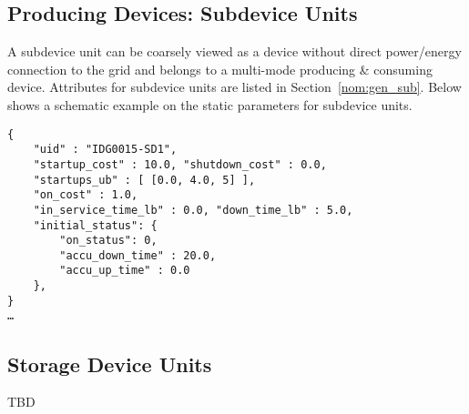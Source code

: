 \subsection{Producing Devices: Subdevice Units}
\label{sec:subdevice}
A subdevice unit can be coarsely viewed as 
a device without direct power/energy connection
to the grid and belongs to a multi-mode producing \& consuming device.
Attributes for subdevice units are listed in Section~\ref{nom:gen_sub}.
Below shows a schematic example on the static parameters for subdevice units.


\begin{verbatim}
{
    "uid" : "IDG0015-SD1",
    "startup_cost" : 10.0, "shutdown_cost" : 0.0,
    "startups_ub" : [ [0.0, 4.0, 5] ],
    "on_cost" : 1.0,
    "in_service_time_lb" : 0.0, "down_time_lb" : 5.0,
    "initial_status": {
        "on_status": 0,
        "accu_down_time" : 20.0,
        "accu_up_time" : 0.0
    },    
}
…     
\end{verbatim}

\subsection{Storage Device Units}
\label{sec:storage}
\begin{todo}[]{}
TBD 
\end{todo}


